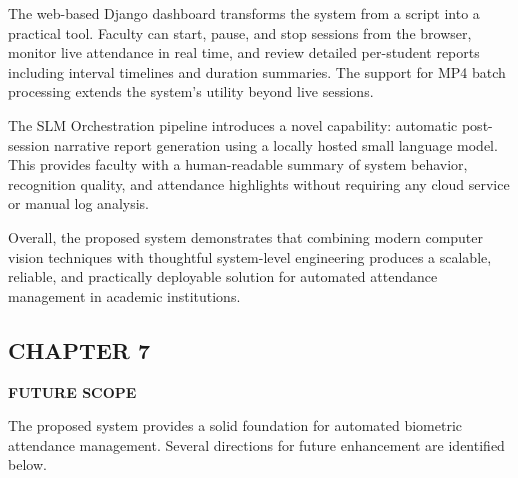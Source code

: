 \documentclass{report}
\begin{document}
{The web-based Django dashboard transforms the system from a script into a practical tool. Faculty\vspace{3pt} can start, pause, and stop sessions from the browser, monitor live attendance in real time, and\vspace{3pt} review detailed per-student reports including interval timelines and duration summaries. The support\vspace{3pt} for MP4 batch processing extends the system's utility beyond live sessions.

The SLM Orchestration pipeline introduces a novel capability: automatic post-session narrative\vspace{3pt} report generation using a locally hosted small language model. This provides faculty with a human-\vspace{3pt}readable summary of system behavior, recognition quality, and attendance highlights without requiring\vspace{3pt} any cloud service or manual log analysis.

Overall, the proposed system demonstrates that combining modern computer vision techniques with\vspace{3pt} thoughtful system-level engineering produces a scalable, reliable, and practically deployable\vspace{3pt} solution for automated attendance management in academic institutions.
}
\newpage
\begin{center}
    \section*{\textbf{CHAPTER 7}}
\end{center}
\begin{center}
    \textbf{\Large FUTURE SCOPE}\\[20pt]
\end{center}

The proposed system provides a solid foundation for automated biometric attendance management.\vspace{3pt} Several directions for future enhancement are identified below.
\end{document}
